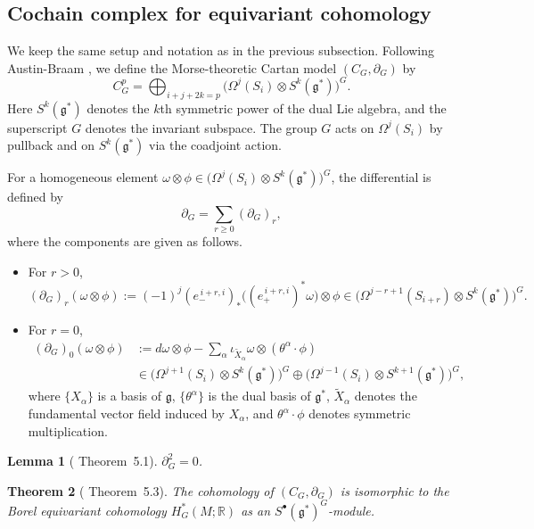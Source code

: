 \documentclass[11pt]{amsart}
\newtheorem{theorem}{Theorem}[section]
\newtheorem{lemma}[theorem]{Lemma}
\theoremstyle{definition}
\numberwithin{equation}{subsection}
\newcommand{\R}{\mathbb{R}}
\newcommand{\p}{\partial}
\newcommand{\g}{\mathfrak{g}}
\begin{document}
\subsection{Cochain complex for equivariant cohomology}
We keep the same setup and notation as in the previous subsection.
Following Austin-Braam \cite{AustinBraam}, we define the Morse-theoretic Cartan model $(C_G,\p_G)$ by
\[
C_G^p
= \bigoplus_{i+j+2k=p}
\bigl(\Omega^j(S_i)\otimes S^k(\g^*)\bigr)^G.
\]
Here $S^k(\g^*)$ denotes the $k$th symmetric power of the dual Lie algebra, and the superscript $G$ denotes the invariant subspace.  
The group $G$ acts on $\Omega^j(S_i)$ by pullback and on $S^k(\g^*)$ via the coadjoint action.

For a homogeneous element $\omega \otimes \phi \in \bigl(\Omega^j(S_i)\otimes S^k(\g^*)\bigr)^G$, the differential is defined by
\[
\p_G = \sum_{r \ge 0} (\p_G)_r,
\]
where the components are given as follows.

\begin{itemize}
\item For $r>0$,
\[
(\p_G)_r(\omega \otimes \phi)
:= (-1)^j (e_-^{\,i+r,i})_*\bigl((e_+^{\,i+r,i})^*\omega\bigr)\otimes\phi
\in \bigl(\Omega^{j-r+1}(S_{i+r})\otimes S^k(\g^*)\bigr)^G.
\]

\item For $r=0$,
\begin{align*}
(\p_G)_0(\omega\otimes\phi)
&:= d\omega\otimes\phi
- \sum_\alpha \iota_{\widetilde X_\alpha}\omega \otimes (\theta^\alpha\cdot\phi) \\
&\in \bigl(\Omega^{j+1}(S_i)\otimes S^{k}(\g^*)\bigr)^G
\oplus
\bigl(\Omega^{j-1}(S_i)\otimes S^{k+1}(\g^*)\bigr)^G,
\end{align*}
where $\{X_\alpha\}$ is a basis of $\g$, $\{\theta^\alpha\}$ is the dual basis of $\g^*$, $\widetilde X_\alpha$ denotes the fundamental vector field induced by $X_\alpha$, and $\theta^\alpha\cdot\phi$ denotes symmetric multiplication.
\end{itemize}

\begin{lemma}[\cite{AustinBraam} Theorem~5.1]
$\p_G^2 = 0$.
\end{lemma}

\begin{theorem}[\cite{AustinBraam} Theorem~5.3]
The cohomology of $(C_G,\p_G)$ is isomorphic to the Borel equivariant cohomology $H_G^*(M;\R)$ as an $S^\bullet(\g^*)^G$-module.
\end{theorem}
\end{document}
